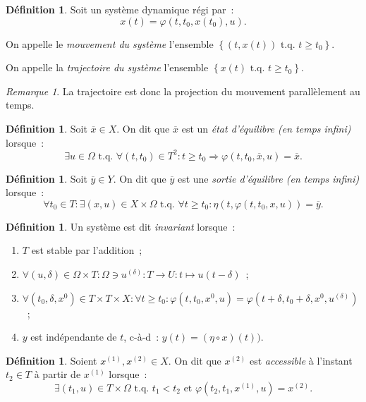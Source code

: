 \documentclass{article}
\theoremstyle{definition}
\newtheorem{déf}[thm]{Définition}
\theoremstyle{remark}
\newtheorem*{rmq}{Remarque}
\newcommand{\tq}{\text{ t.q. }}
\begin{document}
	\begin{déf} Soit un système dynamique régi par~:
	\[x(t) = \varphi(t, t_0, x(t_0), u).\]

	On appelle le \textit{mouvement du système} l'ensemble $\left\{(t, x(t)) \tq t \geq t_0\right\}$.

	On appelle la \textit{trajectoire du système} l'ensemble $\left\{x(t) \tq t \geq t_0\right\}$.
	\end{déf}

	\begin{rmq} La trajectoire est donc la projection du mouvement parallèlement au temps.
	\end{rmq}

	\begin{déf} Soit $\overline x \in X$. On dit que $\overline x$ est un \textit{état d'équilibre (en temps infini)} lorsque~:
	\[\exists u \in \Omega \tq \forall (t, t_0) \in T^2 : t \geq t_0 \Rightarrow \varphi(t, t_0, \overline x, u) = \overline x.\]
	\end{déf}

	\begin{déf} Soit $\overline y \in Y$. On dit que $\overline y$ est une \textit{sortie d'équilibre (en temps infini)} lorsque~:
	\[\forall t_0 \in T : \exists (x, u) \in X \times \Omega \tq \forall t \geq t_0 : \eta\left(t, \varphi(t, t_0, x, u)\right) = \overline y.\]
	\end{déf}

	\begin{déf} Un système est dit \textit{invariant} lorsque~:
	\begin{enumerate}
		\item $T$ est stable par l'addition~;
		\item $\forall (u, \delta) \in \Omega \times T : \Omega \ni u^{(\delta)} : T \to U : t \mapsto u(t-\delta)$~;
		\item $\forall (t_0, \delta, x^0) \in T \times T \times X : \forall t \geq t_0 : \varphi\left(t, t_0, x^0, u\right)
			= \varphi\left(t+\delta, t_0+\delta, x^0, u^{(\delta)}\right)$~;
		\item $y$ est indépendante de $t$, c-à-d~: $y(t) = (\eta \circ x)(t))$.
	\end{enumerate}
	\end{déf}

	\begin{déf} Soient $x^{(1)}, x^{(2)} \in X$. On dit que $x^{(2)}$ est \textit{accessible} à l'instant $t_2 \in T$ à partir de $x^{(1)}$ lorsque~:
	\[\exists (t_1, u) \in T \times \Omega \tq t_1 < t_2 \text{ et } \varphi(t_2, t_1, x^{(1)}, u) = x^{(2)}.\]
	\end{déf}
\end{document}
